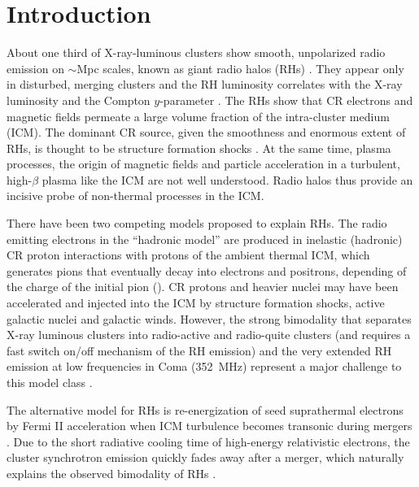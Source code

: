 \documentclass[a4paper,fleqn,usenatbib]{mnras}
\begin{document}
\section{Introduction}
About one third of X-ray-luminous clusters show smooth, unpolarized
radio emission on $\sim$Mpc scales, known as giant radio halos (RHs)
\citep{2014IJMPD..2330007B}. They appear only in disturbed, merging
clusters and the RH luminosity correlates with the X-ray luminosity
\citep{2001A&A...369..441G,2012A&ARv..20...54F} and the Compton
$y$-parameter \citep{2012MNRAS.421L.112B,2013A&A...554A.140P}. The RHs
show that CR electrons and magnetic fields permeate a large volume
fraction of the intra-cluster medium (ICM). The dominant CR source,
given the smoothness and enormous extent of RHs, is thought to be
structure formation shocks \citep{miniati01,pfrommer08}. At the same
time, plasma processes, the origin of magnetic fields and particle
acceleration in a turbulent, high-$\beta$ plasma like the ICM are not
well understood. Radio halos thus provide an incisive probe of
non-thermal processes in the ICM.

There have been two competing models proposed to explain RHs.  The
radio emitting electrons in the ``hadronic model'' are produced in
inelastic (hadronic) CR proton interactions with protons of the
ambient thermal ICM, which generates pions that eventually decay into
electrons and positrons, depending of the charge of the initial pion
(\citealp{1980ApJ...239L..93D,1999APh....12..169B,2001ApJ...562..233M,
  2004A&A...413...17P,2008MNRAS.385.1211P,ensslin11}). CR protons and
heavier nuclei may have been accelerated and injected into the ICM by
structure formation shocks, active galactic nuclei and galactic
winds. However, the strong bimodality that separates X-ray luminous
clusters into radio-active and radio-quite clusters (and requires a
fast switch on/off mechanism of the RH emission) and the very extended
RH emission at low frequencies in Coma (352~MHz) represent a major
challenge to this model class \citep{brunetti12,2014MNRAS.438..124Z}.

The alternative model for RHs is re-energization of seed suprathermal
electrons by Fermi II acceleration when ICM turbulence becomes
transonic during mergers
\citep{1987A&A...182...21S,1993ApJ...406..399G,2001MNRAS.320..365B,
  2004MNRAS.350.1174B,brunetti07,brunetti11,2015ApJ...800...60M}. Due
to the short radiative cooling time of high-energy relativistic
electrons, the cluster synchrotron emission quickly fades away after a
merger, which naturally explains the observed bimodality of RHs
\cite[see e.g.][]{2013MNRAS.429.3564D,2014MNRAS.443.3564D}.
\end{document}
